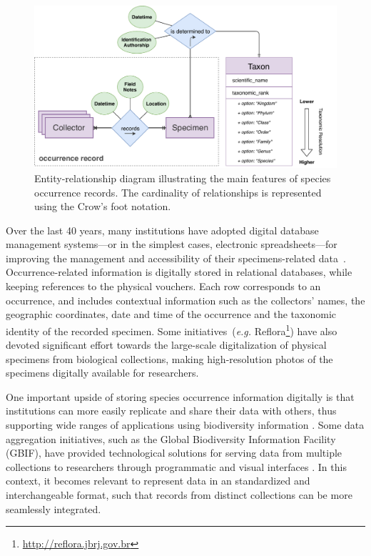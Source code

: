 \begin{figure}[ht]
  	\centering
    \includegraphics[width=\linewidth]{figures/collections_data/occurrences_er.pdf}
    \caption[Entity-relationship diagram illustrating the main features of species occurrence records]{Entity-relationship diagram illustrating the main features of species occurrence records. The cardinality of relationships is represented using the Crow's foot notation.}
    \label{fig:occurrences_er}
\end{figure}



Over the last 40 years, many institutions have adopted digital database management systems---or in the simplest cases, electronic spreadsheets---for improving the management and accessibility of their specimens-related data~\cite{Sunderland2013}.
Occurrence-related information is digitally stored in relational databases, while keeping references to the physical vouchers.
Each row corresponds to an occurrence, and includes contextual information such as the collectors' names, the geographic coordinates, date and time of the occurrence and the taxonomic identity of the recorded specimen.
Some initiatives~(\textit{e.g.} Reflora\footnote{\url{http://reflora.jbrj.gov.br}}) have also devoted significant effort towards the large-scale digitalization of physical specimens from biological collections, making high-resolution photos of the specimens digitally available for researchers.

One important upside of storing species occurrence information digitally is that institutions can more easily replicate and share their data with others, thus supporting wide ranges of applications using biodiversity information \cite{Newbold2010}.
Some data aggregation initiatives, such as the Global Biodiversity Information Facility (GBIF), have provided technological solutions for serving data from multiple collections to researchers through programmatic and visual interfaces \cite{gbif}.
In this context, it becomes relevant to represent data in an standardized and interchangeable format, such that records from distinct collections can be more seamlessly integrated.

